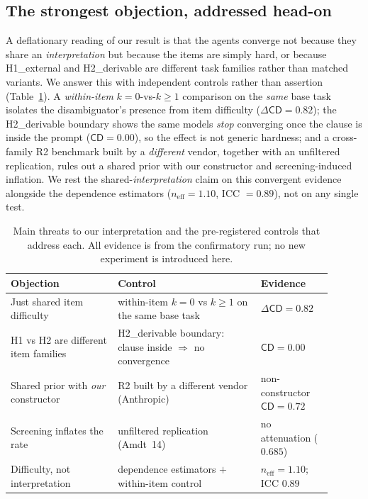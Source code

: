 \documentclass[acmsmall,screen,nonacm]{acmart}
\newcommand{\cd}{\textsf{CD}}
\newcommand{\neff}{\ensuremath{n_{\mathrm{eff}}}}
\begin{document}
\subsection{The strongest objection, addressed head-on}
A deflationary reading of our result is that the agents converge not because they share an
\emph{interpretation} but because the items are simply hard, or because H1\_external and H2\_derivable are
different task families rather than matched variants. We answer this with independent controls rather than
assertion (Table~\ref{tab:threats}). A \emph{within-item} $k{=}0$-vs-$k{\ge}1$ comparison on the \emph{same}
base task isolates the disambiguator's presence from item difficulty ($\Delta\cd=0.82$); the H2\_derivable
boundary shows the same models \emph{stop} converging once the clause is inside the prompt ($\cd=0.00$), so
the effect is not generic hardness; and a cross-family R2 benchmark built by a \emph{different} vendor,
together with an unfiltered replication, rules out a shared prior with our constructor and
screening-induced inflation. We rest the shared-\emph{interpretation} claim on this convergent evidence
alongside the dependence estimators ($\neff=1.10$, ICC $=0.89$), not on any single test.

\begin{table}[t]
\centering\small
\caption{Main threats to our interpretation and the pre-registered controls that address each. All evidence
is from the confirmatory run; no new experiment is introduced here.}
\label{tab:threats}
\begin{tabular}{@{}p{0.30\linewidth}p{0.40\linewidth}p{0.20\linewidth}@{}}
\toprule
Objection & Control & Evidence \\
\midrule
Just shared item difficulty & within-item $k{=}0$ vs $k{\ge}1$ on the same base task & $\Delta\cd=0.82$ \\
H1 vs H2 are different item families & H2\_derivable boundary: clause inside $\Rightarrow$ no convergence & $\cd=0.00$ \\
Shared prior with \emph{our} constructor & R2 built by a different vendor (Anthropic) & non-constructor $\cd=0.72$ \\
Screening inflates the rate & unfiltered replication (Amdt~14) & no attenuation ($0.685$) \\
Difficulty, not interpretation & dependence estimators $+$ within-item control & $\neff{=}1.10$; ICC $0.89$ \\
\bottomrule
\end{tabular}
\end{table}
\end{document}
